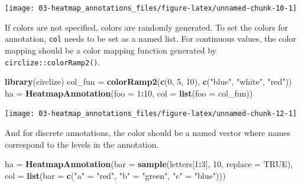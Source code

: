 \documentclass[]{book}
\newenvironment{Shaded}{\begin{snugshade}}{\end{snugshade}}
\newcommand{\KeywordTok}[1]{\textcolor[rgb]{0.13,0.29,0.53}{\textbf{#1}}}
\newcommand{\DataTypeTok}[1]{\textcolor[rgb]{0.13,0.29,0.53}{#1}}
\newcommand{\DecValTok}[1]{\textcolor[rgb]{0.00,0.00,0.81}{#1}}
\newcommand{\StringTok}[1]{\textcolor[rgb]{0.31,0.60,0.02}{#1}}
\newcommand{\OtherTok}[1]{\textcolor[rgb]{0.56,0.35,0.01}{#1}}
\newcommand{\OperatorTok}[1]{\textcolor[rgb]{0.81,0.36,0.00}{\textbf{#1}}}
\newcommand{\NormalTok}[1]{#1}
\theoremstyle{definition}
\theoremstyle{definition}
\theoremstyle{definition}
\theoremstyle{remark}
\begin{document}
\begin{center}\texttt{[image: 03-heatmap\_annotations\_files/figure-latex/unnamed-chunk-10-1]} \end{center}

If colors are not specified, colors are randomly generated. To set the
colors for annotation, \texttt{col} needs to be set as a named list. For
continuous values, the color mapping should be a color mapping function
generated by \texttt{circlize::colorRamp2()}.

\begin{Shaded}
\begin{Highlighting}[]
\KeywordTok{library}\NormalTok{(circlize)}
\NormalTok{col_fun =}\StringTok{ }\KeywordTok{colorRamp2}\NormalTok{(}\KeywordTok{c}\NormalTok{(}\DecValTok{0}\NormalTok{, }\DecValTok{5}\NormalTok{, }\DecValTok{10}\NormalTok{), }\KeywordTok{c}\NormalTok{(}\StringTok{"blue"}\NormalTok{, }\StringTok{"white"}\NormalTok{, }\StringTok{"red"}\NormalTok{))}
\NormalTok{ha =}\StringTok{ }\KeywordTok{HeatmapAnnotation}\NormalTok{(}\DataTypeTok{foo =} \DecValTok{1}\OperatorTok{:}\DecValTok{10}\NormalTok{, }\DataTypeTok{col =} \KeywordTok{list}\NormalTok{(}\DataTypeTok{foo =}\NormalTok{ col_fun))}
\end{Highlighting}
\end{Shaded}

\begin{center}\texttt{[image: 03-heatmap\_annotations\_files/figure-latex/unnamed-chunk-12-1]} \end{center}

And for discrete annotations, the color should be a named vector where
names correspond to the levels in the annotation.

\begin{Shaded}
\begin{Highlighting}[]
\NormalTok{ha =}\StringTok{ }\KeywordTok{HeatmapAnnotation}\NormalTok{(}\DataTypeTok{bar =} \KeywordTok{sample}\NormalTok{(letters[}\DecValTok{1}\OperatorTok{:}\DecValTok{3}\NormalTok{], }\DecValTok{10}\NormalTok{, }\DataTypeTok{replace =} \OtherTok{TRUE}\NormalTok{),}
    \DataTypeTok{col =} \KeywordTok{list}\NormalTok{(}\DataTypeTok{bar =} \KeywordTok{c}\NormalTok{(}\StringTok{"a"}\NormalTok{ =}\StringTok{ "red"}\NormalTok{, }\StringTok{"b"}\NormalTok{ =}\StringTok{ "green"}\NormalTok{, }\StringTok{"c"}\NormalTok{ =}\StringTok{ "blue"}\NormalTok{)))}
\end{Highlighting}
\end{Shaded}
\end{document}
